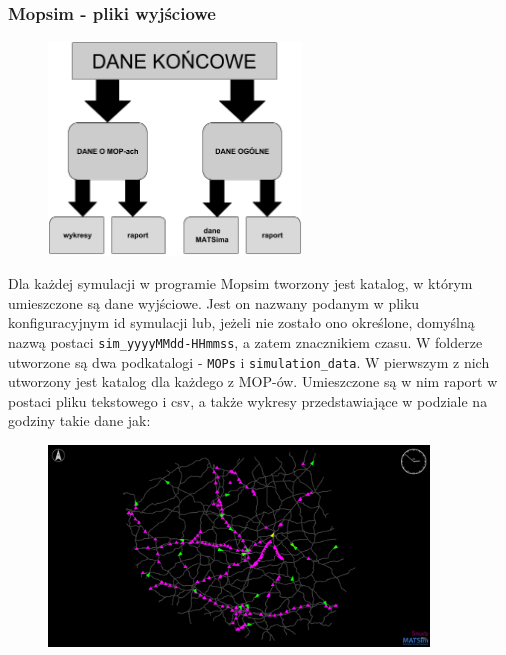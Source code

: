 \subsubsection{Mopsim - pliki wyjściowe}
    \begin{figure}[h]
        \centering
        \includegraphics[width=0.6\textwidth]{images/mopsim/dane-wyjsciowe.png}
    \end{figure}
Dla każdej symulacji w programie Mopsim tworzony jest katalog, w którym umieszczone są dane wyjściowe. Jest on nazwany podanym w pliku konfiguracyjnym id symulacji lub, jeżeli nie zostało ono określone, domyślną nazwą postaci \texttt{sim\_yyyyMMdd-HHmmss}, a zatem znacznikiem czasu. W folderze utworzone są dwa podkatalogi - \texttt{MOPs} i \texttt{simulation\_data}. W pierwszym z nich utworzony jest katalog dla każdego z MOP-ów. Umieszczone są w nim raport w postaci pliku tekstowego i csv, a także wykresy przedstawiające w podziale na godziny takie dane jak:
    \begin{figure}[!b]
        \centering
        \includegraphics[width=0.9\textwidth]{images/mopsim/sim-via.png}
    \end{figure}

